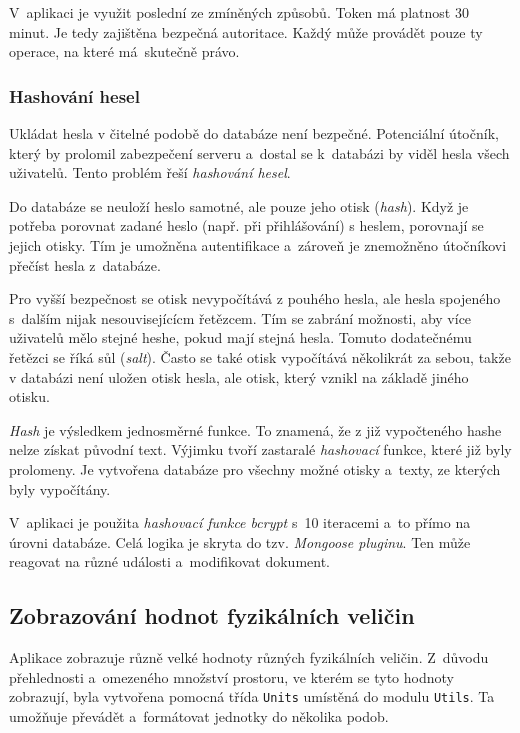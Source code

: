 \documentclass[a4paper,12pt]{article}
\def\code#1{\texttt{#1}}
\begin{document}
V~aplikaci je využit poslední ze zmíněných způsobů. Token má platnost 30 minut. Je tedy zajištěna bezpečná autoritace. Každý může provádět pouze ty operace, na které má~skutečně právo.

\subsubsection{Hashování hesel}

Ukládat hesla v čitelné podobě do databáze není bezpečné. Potenciální útočník, který by prolomil zabezpečení serveru a~dostal se k~databázi by viděl hesla všech uživatelů. Tento problém řeší \textit{hashování hesel}.

Do databáze se neuloží heslo samotné, ale pouze jeho otisk (\textit{hash}). Když je potřeba porovnat zadané heslo (např. při přihlášování) s heslem, porovnají se jejich otisky. Tím je umožněna autentifikace a~zároveň je znemožněno útočníkovi přečíst hesla z~databáze.

Pro vyšší bezpečnost se otisk nevypočítává z pouhého hesla, ale hesla spojeného s~dalším nijak nesouvisejícícm řetězcem. Tím se zabrání možnosti, aby více uživatelů mělo stejné heshe, pokud mají stejná hesla. Tomuto dodatečnému řetězci se říká sůl (\textit{salt}). Často se také otisk vypočítává několikrát za sebou, takže v databázi není uložen otisk hesla, ale otisk, který vznikl na základě jiného otisku.

\textit{Hash} je výsledkem jednosměrné funkce. To znamená, že z již vypočteného hashe nelze získat původní text. Výjimku tvoří zastaralé \textit{hashovací} funkce, které již byly prolomeny. Je vytvořena databáze pro všechny možné otisky a~texty, ze kterých byly vypočítány.

V~aplikaci je použita \textit{hashovací funkce bcrypt} s~10 iteracemi a~to přímo na úrovni databáze. Celá logika je skryta do tzv. \textit{Mongoose pluginu}. Ten může reagovat na různé události a~modifikovat dokument.



\subsection{Zobrazování hodnot fyzikálních veličin}

Aplikace zobrazuje různě velké hodnoty různých fyzikálních veličin. Z~důvodu přehlednosti a~omezeného množství prostoru, ve kterém se tyto hodnoty zobrazují, byla vytvořena pomocná třída \code{Units} umístěná do modulu \code{Utils}. Ta umožňuje převádět a~formátovat jednotky do několika podob.
\end{document}

